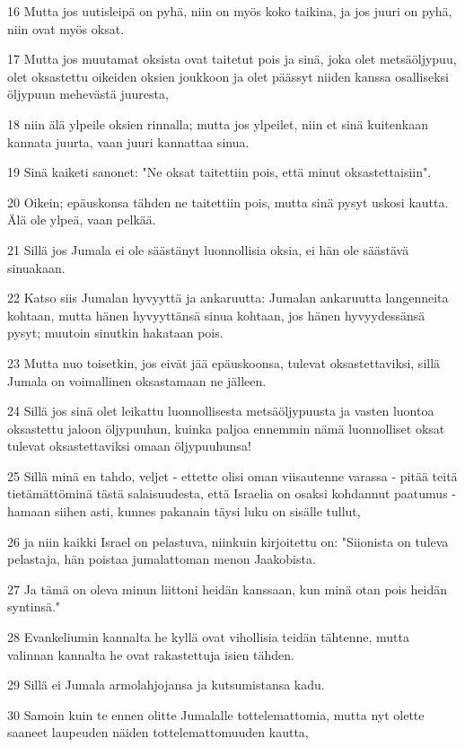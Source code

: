 \par 16 Mutta jos uutisleipä on pyhä, niin on myös koko taikina, ja jos juuri on pyhä, niin ovat myös oksat.
\par 17 Mutta jos muutamat oksista ovat taitetut pois ja sinä, joka olet metsäöljypuu, olet oksastettu oikeiden oksien joukkoon ja olet päässyt niiden kanssa osalliseksi öljypuun mehevästä juuresta,
\par 18 niin älä ylpeile oksien rinnalla; mutta jos ylpeilet, niin et sinä kuitenkaan kannata juurta, vaan juuri kannattaa sinua.
\par 19 Sinä kaiketi sanonet: "Ne oksat taitettiin pois, että minut oksastettaisiin".
\par 20 Oikein; epäuskonsa tähden ne taitettiin pois, mutta sinä pysyt uskosi kautta. Älä ole ylpeä, vaan pelkää.
\par 21 Sillä jos Jumala ei ole säästänyt luonnollisia oksia, ei hän ole säästävä sinuakaan.
\par 22 Katso siis Jumalan hyvyyttä ja ankaruutta: Jumalan ankaruutta langenneita kohtaan, mutta hänen hyvyyttänsä sinua kohtaan, jos hänen hyvyydessänsä pysyt; muutoin sinutkin hakataan pois.
\par 23 Mutta nuo toisetkin, jos eivät jää epäuskoonsa, tulevat oksastettaviksi, sillä Jumala on voimallinen oksastamaan ne jälleen.
\par 24 Sillä jos sinä olet leikattu luonnollisesta metsäöljypuusta ja vasten luontoa oksastettu jaloon öljypuuhun, kuinka paljoa ennemmin nämä luonnolliset oksat tulevat oksastettaviksi omaan öljypuuhunsa!
\par 25 Sillä minä en tahdo, veljet - ettette olisi oman viisautenne varassa - pitää teitä tietämättöminä tästä salaisuudesta, että Israelia on osaksi kohdannut paatumus - hamaan siihen asti, kunnes pakanain täysi luku on sisälle tullut,
\par 26 ja niin kaikki Israel on pelastuva, niinkuin kirjoitettu on: "Siionista on tuleva pelastaja, hän poistaa jumalattoman menon Jaakobista.
\par 27 Ja tämä on oleva minun liittoni heidän kanssaan, kun minä otan pois heidän syntinsä."
\par 28 Evankeliumin kannalta he kyllä ovat vihollisia teidän tähtenne, mutta valinnan kannalta he ovat rakastettuja isien tähden.
\par 29 Sillä ei Jumala armolahjojansa ja kutsumistansa kadu.
\par 30 Samoin kuin te ennen olitte Jumalalle tottelemattomia, mutta nyt olette saaneet laupeuden näiden tottelemattomuuden kautta,
